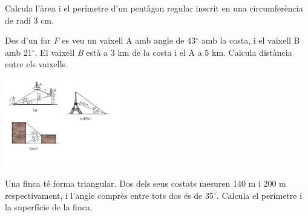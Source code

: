 \begin{mylist}
	\exer
	Calcula l'àrea i el perímetre d'un pentàgon regular inscrit en una
	circumferència de radi 3 cm.
	
	
	\pagebreak
	
	\exer
	Des d'un far \emph{F} es veu un vaixell A amb angle de 43${}^\circ$ amb la
	costa, i el vaixell B amb 21${}^\circ$. El vaixell \emph{B} està a 3 km de la
	costa i el A a 5 km. Calcula distància entre els vaixells.
	\begin{center}
		\includegraphics[width=5.1cm]{img-03/far}
	\end{center}
	
	
	\exer
	Una finca té forma triangular. Dos dels seus costats mesuren 140 m i
	200 m respectivament, i l'angle comprès entre tots dos és de 35${}^\circ$.
	Calcula el perímetre i la superfície de la finca.
	

\end{mylist}
